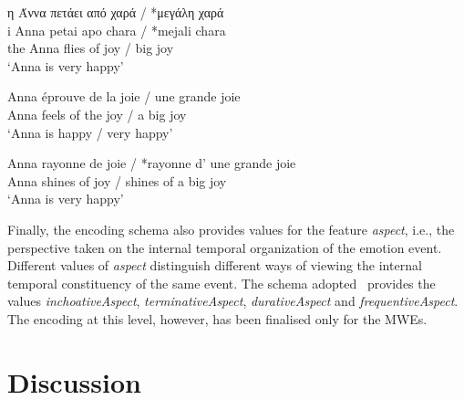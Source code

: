 \documentclass[output=paper]{langsci/langscibook}
\begin{document}
\begin{exe}
\ex \label{ex:3:40}
\glll η Άννα πετάει από χαρά / *μεγάλη χαρά {} {} {}\\
i Anna petai apo chara / *mejali chara {} {} {}\\
the Anna flies of joy / big joy \\
\glt %
‘Anna is very happy’
\end{exe}

\begin{exe}
\ex \label{ex:3:41}
\gll Anna éprouve de la joie / une grande joie \\
 Anna feels of the joy / a big joy\\
\glt ‘Anna is happy / very happy’
\end{exe}

\begin{exe}
\ex \label{ex:3:42}
\gll Anna rayonne de joie / *rayonne d’  une grande joie \\
Anna shines of joy / shines of a big joy\\
\glt ‘Anna is very happy’
\end{exe}



Finally, the encoding schema also provides values for the feature
 \textit{aspect}, i.e., the perspective taken on the internal
temporal organization of the emotion event. Different values of
\textit{aspect} distinguish different ways of viewing the
internal temporal constituency of the same event. The schema adopted
\ provides the values \textit{inchoativeAspect},
\textit{terminativeAspect},
\textit{durativeAspect} and
\textit{frequentiveAspect}. The encoding at this level,
however, has been finalised only for the  MWEs.

\section{Discussion}
\end{document}
